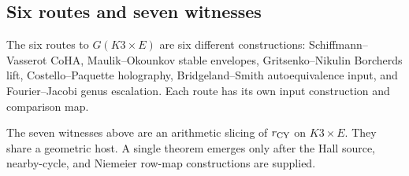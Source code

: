 \subsection{Six routes and seven witnesses}
\label{rcy:subsec:six-routes-seven-witnesses}

The six routes to $G(K3\times E)$ are six different constructions:
Schiffmann--Vasserot CoHA, Maulik--Okounkov stable envelopes,
Gritsenko--Nikulin Borcherds lift, Costello--Paquette holography,
Bridgeland--Smith autoequivalence input, and Fourier--Jacobi
genus escalation.  Each route has its own input construction and
comparison map.

The seven witnesses above are an arithmetic slicing of $r_{\mathrm{CY}}$ on
$K3\times E$.  They share a geometric host.  A single theorem emerges
only after the Hall source, nearby-cycle, and Niemeier row-map
constructions are supplied.
